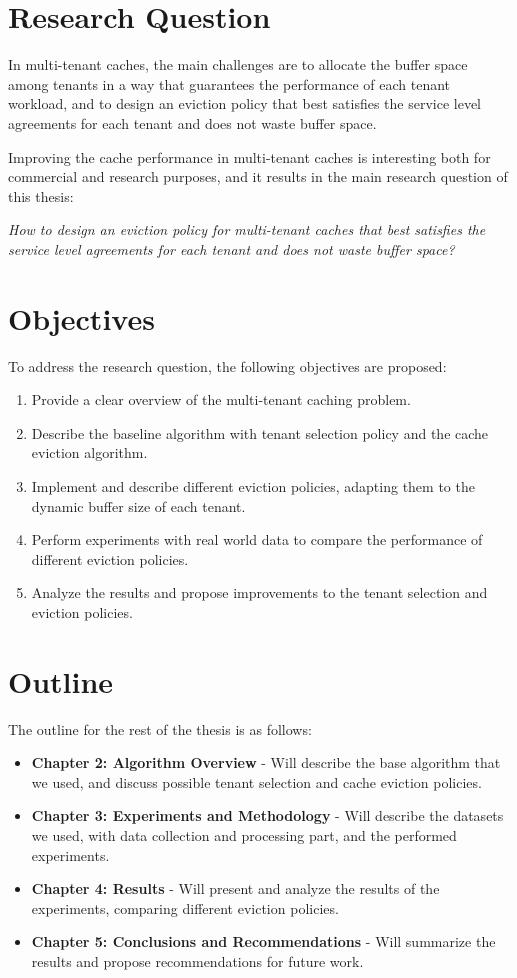 \section{Research Question}

In multi-tenant caches, the main challenges are to allocate the buffer space among tenants
in a way that guarantees the performance of each tenant workload, and to design an eviction
policy that best satisfies the service level agreements for each tenant and does not waste
buffer space. 

Improving the cache performance in multi-tenant caches is interesting both for commercial
and research purposes, and it results in the main research question of this thesis:

\textit{How to design an eviction policy for multi-tenant caches that best satisfies 
the service level agreements for each tenant and does not waste buffer space?}

\section{Objectives}

To address the research question, the following objectives are proposed:

\begin{enumerate}
    \item Provide a clear overview of the multi-tenant caching problem.
    \item Describe the baseline algorithm with tenant selection policy and the cache eviction algorithm.
    \item Implement and describe different eviction policies, adapting them to the dynamic buffer size of each tenant.
    \item Perform experiments with real world data to compare the performance of different eviction policies.
    \item Analyze the results and propose improvements to the tenant selection and eviction policies.
\end{enumerate}

\section{Outline}

The outline for the rest of the thesis is as follows:

\begin{itemize}
    \item \textbf{Chapter 2: Algorithm Overview} - Will describe the base algorithm that we used, and discuss possible tenant selection and cache eviction policies.
    \item \textbf{Chapter 3: Experiments and Methodology} - Will describe the datasets we used, with data collection and processing part, and the performed experiments.
    \item \textbf{Chapter 4: Results} - Will present and analyze the results of the experiments, comparing different eviction policies.
    \item \textbf{Chapter 5: Conclusions and Recommendations} - Will summarize the results and propose recommendations for future work.
\end{itemize}